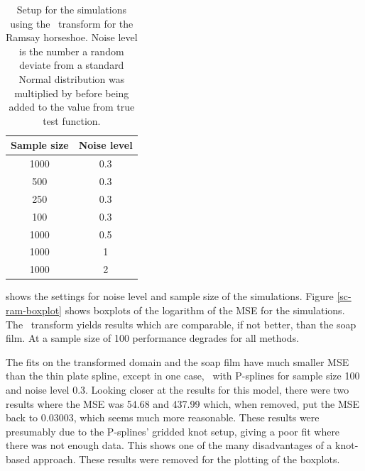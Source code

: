 \begin{table}[tb]
\centering
\begin{tabular}{c c}\\
Sample size & Noise level \\
\hline
1000 & 0.3 \\
500 & 0.3 \\
250 & 0.3 \\
100 & 0.3 \\
1000 & 0.5 \\
1000 & 1 \\
1000 & 2 \\
\end{tabular}
\caption{Setup for the simulations using the \sch\ transform for the Ramsay horseshoe. Noise level is the number a random deviate from a standard Normal distribution was multiplied by before being added to the value from true test function.}
\label{scramsimtable}
\end{table}

 shows the settings for noise level and sample size of the simulations. Figure \ref{sc-ram-boxplot} shows boxplots of the logarithm of the MSE for the simulations. The \sch\ transform yields results which are comparable, if not better, than the soap film. At a sample size of 100 performance degrades for all methods. 

The fits on the transformed domain and the soap film have much smaller MSE than the thin plate spline, except in one case, \sch\ with P-splines for sample size 100 and noise level 0.3. Looking closer at the results for this model, there were two results where the MSE was 54.68 and 437.99 which, when removed, put the MSE back to 0.03003, which seems much more reasonable. These results were presumably due to the P-splines' gridded knot setup, giving a poor fit where there was not enough data. This shows one of the many disadvantages of a knot-based approach. These results were removed for the plotting of the boxplots.

